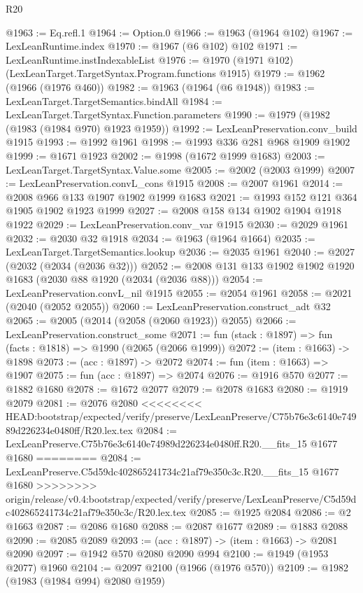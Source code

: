 \begin{lexlean}{R20}
\begin{coremodule}
{{{{{{{{{{{{{{{{{{{{{{{{{{{{{{{{{{{{{{{{{{{{{{{{{{{{{{{{{{{{{{{@1963 := Eq.refl.{1}
@1964 := Option.{0}
@1966 := @1963 (@1964 @102)
@1967 := LexLeanRuntime.index
@1970 := @1967 (@6 @102) @102
@1971 := LexLeanRuntime.instIndexableList
@1976 := @1970 (@1971 @102) (LexLeanTarget.TargetSyntax.Program.functions @1915)
@1979 := @1962 (@1966 (@1976 @460))
@1982 := @1963 (@1964 (@6 @1948))
@1983 := LexLeanTarget.TargetSemantics.bindAll
@1984 := LexLeanTarget.TargetSyntax.Function.parameters
@1990 := @1979 (@1982 (@1983 (@1984 @970) @1923 @1959))
@1992 := LexLeanPreservation.conv_build @1915
@1993 := @1992 @1961
@1998 := @1993 @336 @281 @968 @1909 @1902
@1999 := @1671 @1923
@2002 := @1998 (@1672 @1999 @1683)
@2003 := LexLeanTarget.TargetSyntax.Value.some
@2005 := @2002 (@2003 @1999)
@2007 := LexLeanPreservation.convL_cons @1915
@2008 := @2007 @1961
@2014 := @2008 @966 @133 @1907 @1902 @1999 @1683
@2021 := @1993 @152 @121 @364 @1905 @1902 @1923 @1999
@2027 := @2008 @158 @134 @1902 @1904 @1918 @1922
@2029 := LexLeanPreservation.conv_var @1915
@2030 := @2029 @1961
@2032 := @2030 @32 @1918
@2034 := @1963 (@1964 @1664)
@2035 := LexLeanTarget.TargetSemantics.lookup
@2036 := @2035 @1961
@2040 := @2027 (@2032 (@2034 (@2036 @32)))
@2052 := @2008 @131 @133 @1902 @1902 @1920 @1683 (@2030 @88 @1920 (@2034 (@2036 @88)))
@2054 := LexLeanPreservation.convL_nil @1915
@2055 := @2054 @1961
@2058 := @2021 (@2040 (@2052 @2055))
@2060 := LexLeanPreservation.construct_adt @32
@2065 := @2005 (@2014 (@2058 (@2060 @1923)) @2055)
@2066 := LexLeanPreservation.construct_some
@2071 := fun (stack : @1897) => fun (facts : @1818) => @1990 (@2065 (@2066 @1999))
@2072 := (item : @1663) -> @1898
@2073 := (acc : @1897) -> @2072
@2074 := fun (item : @1663) => @1907
@2075 := fun (acc : @1897) => @2074
@2076 := @1916 @570
@2077 := @1882 @1680
@2078 := @1672 @2077
@2079 := @2078 @1683
@2080 := @1919 @2079
@2081 := @2076 @2080
<<<<<<<< HEAD:bootstrap/expected/verify/preserve/LexLeanPreserve/C75b76e3c6140e74989d226234e0480ff/R20.lex.tex
@2084 := LexLeanPreserve.C75b76e3c6140e74989d226234e0480ff.R20.__fits_15 @1677 @1680
========
@2084 := LexLeanPreserve.C5d59dc402865241734c21af79e350c3c.R20.__fits_15 @1677 @1680
>>>>>>>> origin/release/v0.4:bootstrap/expected/verify/preserve/LexLeanPreserve/C5d59dc402865241734c21af79e350c3c/R20.lex.tex
@2085 := @1925 @2084
@2086 := @2 @1663
@2087 := @2086 @1680
@2088 := @2087 @1677
@2089 := @1883 @2088
@2090 := @2085 @2089
@2093 := (acc : @1897) -> (item : @1663) -> @2081 @2090
@2097 := @1942 @570 @2080 @2090 @994
@2100 := @1949 (@1953 @2077) @1960
@2104 := @2097 @2100 (@1966 (@1976 @570))
@2109 := @1982 (@1983 (@1984 @994) @2080 @1959)
}}}}}}}}}}}}}}}}}}}}}}}}}}}}}}}}}}}}}}}}}}}}}}}}}}}}}}}}}}}}}}}
\end{coremodule}
\end{lexlean}

